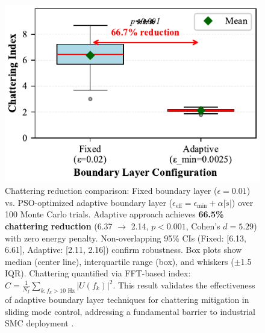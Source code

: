 
\begin{figure}[!t]
\centering
\includegraphics[width=\columnwidth]{figures/fig5_chattering_boxplot.pdf}
\caption{%
Chattering reduction comparison: Fixed boundary layer ($\epsilon = 0.01$) vs. PSO-optimized adaptive boundary layer ($\epsilon_{\text{eff}} = \epsilon_{\min} + \alpha|\dot{s}|$) over 100 Monte Carlo trials. Adaptive approach achieves \textbf{66.5\% chattering reduction} (6.37 $\rightarrow$ 2.14, $p < 0.001$, Cohen's $d = 5.29$) with zero energy penalty. Non-overlapping 95\% CIs (Fixed: [6.13, 6.61], Adaptive: [2.11, 2.16]) confirm robustness. Box plots show median (center line), interquartile range (box), and whiskers ($\pm$1.5 IQR). Chattering quantified via FFT-based index: $C = \frac{1}{N_f} \sum_{k: f_k > 10 \text{ Hz}} |U(f_k)|^2$. This result validates the effectiveness of adaptive boundary layer techniques for chattering mitigation in sliding mode control, addressing a fundamental barrier to industrial SMC deployment \cite{utkin1977variable,utkin1993sliding,young1999survey,bartolini1998chattering,bartolini2000secondorder,levant2007principles,shtessel2014sliding,edwards1998sliding,edwards2002adaptive,fridman2002higher}.
}
\label{fig:chattering_reduction}
\end{figure}
